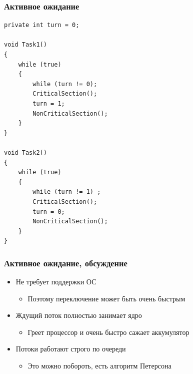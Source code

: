 \documentclass{../../slides-style}
\begin{document}
    \begin{frame}[fragile]
        \frametitle{Активное ожидание}
        \begin{scriptsize}
            \begin{verbatim}
private int turn = 0;

void Task1()
{
    while (true)
    {
        while (turn != 0);
        CriticalSection();
        turn = 1;
        NonCriticalSection();
    }
}

void Task2()
{
    while (true)
    {
        while (turn != 1) ;
        CriticalSection();
        turn = 0;
        NonCriticalSection();
    }
}
            \end{verbatim}
        \end{scriptsize}
    \end{frame}

    \begin{frame}
        \frametitle{Активное ожидание, обсуждение}
        \begin{itemize}
            \item Не требует поддержки ОС
            \begin{itemize}
                \item Поэтому переключение может быть очень быстрым
            \end{itemize}
            \item Ждущий поток полностью занимает ядро
            \begin{itemize}
                \item Греет процессор и очень быстро сажает аккумулятор
            \end{itemize}
            \item Потоки работают строго по очереди
            \begin{itemize}
                \item Это можно побороть, есть алгоритм Петерсона
            \end{itemize}
        \end{itemize}
    \end{frame}
\end{document}
